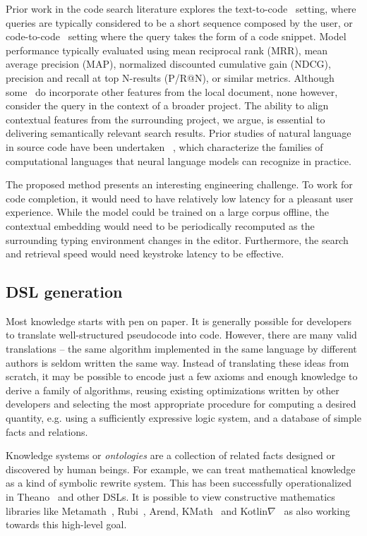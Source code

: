\documentclass[10pt]{article}
\begin{document}
Prior work in the code search literature explores the text-to-code~\cite{husain2019codesearchnet} setting, where queries are typically considered to be a short sequence composed by the user, or code-to-code~\cite{kim2018facoy} setting where the query takes the form of a code snippet. Model performance typically evaluated using mean reciprocal rank (MRR), mean average precision (MAP), normalized discounted cumulative gain (NDCG), precision and recall at top N-results (P/R@N), or similar metrics. Although some~\cite{asyrofi2020ausearch} do incorporate other features from the local document, none however, consider the query in the context of a broader project. The ability to align contextual features from the surrounding project, we argue, is essential to delivering semantically relevant search results. Prior studies of natural language in source code have been undertaken ~\cite{weiss2018practical, chirkova2020empirical, chen2021evaluating}, which characterize the families of computational languages that neural language models can recognize in practice.

The proposed method presents an interesting engineering challenge. To work for code completion, it would need to have relatively low latency for a pleasant user experience. While the model could be trained on a large corpus offline, the contextual embedding would need to be periodically recomputed as the surrounding typing environment changes in the editor. Furthermore, the search and retrieval speed would need keystroke latency to be effective.

  \subsection{DSL generation}\label{subsec:gen}

Most knowledge starts with pen on paper. It is generally possible for developers to translate well-structured pseudocode into code. However, there are many valid translations -- the same algorithm implemented in the same language by different authors is seldom written the same way. Instead of translating these ideas from scratch, it may be possible to encode just a few axioms and enough knowledge to derive a family of algorithms, reusing existing optimizations written by other developers and selecting the most appropriate procedure for computing a desired quantity, e.g. using a sufficiently expressive logic system, and a database of simple facts and relations.

Knowledge systems or \textit{ontologies} are a collection of related facts designed or discovered by human beings. For example, we can treat mathematical knowledge as a kind of symbolic rewrite system. This has been successfully operationalized in Theano~\cite{bergstra2010theano} and other DSLs. It is possible to view constructive mathematics libraries like Metamath~\cite{megill2006metamath}, Rubi~\cite{rich2009knowledge}, Arend, KMath~\cite{nozik2019kotlin} and Kotlin$\nabla$~\cite{considine2019kotlingrad} as also working towards this high-level goal.
\end{document}
